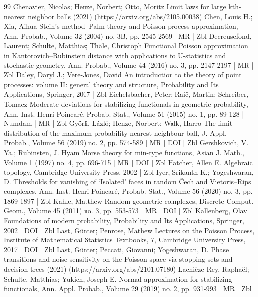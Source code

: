 \documentclass[10pt]{amsart}
\theoremstyle{definition}\newtheorem{defi}[theo]{Definition}\newtheorem{rema}[theo]{Remark}\newtheorem{exam}[theo]{Example}\newtheorem{exem}[theo]{Example}\newtheorem{nota}[theo]{Notation}
\begin{document}
\begin{thebibliography}{99}
Chenavier, Nicolas; Henze, Norbert; Otto, Moritz Limit laws for large kth-nearest neighbor balls (2021) (https://arxiv.org/abs/2105.00038)
Chen, Louis H.; Xia, Aihua Stein’s method, Palm theory and Poisson process approximation, Ann. Probab., Volume 32 (2004) no. 3B, pp. 2545-2569 | MR | Zbl
Decreusefond, Laurent; Schulte, Matthias; Thäle, Christoph Functional Poisson approximation in Kantorovich–Rubinstein distance with applications to U-statistics and stochastic geometry, Ann. Probab., Volume 44 (2016) no. 3, pp. 2147-2197 | MR | Zbl
Daley, Daryl J.; Vere-Jones, David An introduction to the theory of point processes: volume II: general theory and structure, Probability and Its Applications, Springer, 2007 | Zbl
Eichelsbacher, Peter; Raič, Martin; Schreiber, Tomacz Moderate deviations for stabilizing functionals in geometric probability, Ann. Inst. Henri Poincaré, Probab. Stat., Volume 51 (2015) no. 1, pp. 89-128 | Numdam | MR | Zbl
Györfi, Lázló; Henze, Norbert; Walk, Harro The limit distribution of the maximum probability nearest-neighbour ball, J. Appl. Probab., Volume 56 (2019) no. 2, pp. 574-589 | MR | DOI | Zbl
Gershkovich, V. Ya.; Rubinsten, J. Hyam Morse theory for min-type functions, Asian J. Math., Volume 1 (1997) no. 4, pp. 696-715 | MR | DOI | Zbl
Hatcher, Allen E. Algebraic topology, Cambridge University Press, 2002 | Zbl
Iyer, Srikanth K.; Yogeshwaran, D. Thresholds for vanishing of ‘Isolated’ faces in random Čech and Vietoris–Rips complexes, Ann. Inst. Henri Poincaré, Probab. Stat., Volume 56 (2020) no. 3, pp. 1869-1897 | Zbl
Kahle, Matthew Random geometric complexes, Discrete Comput. Geom., Volume 45 (2011) no. 3, pp. 553-573 | MR | DOI | Zbl
Kallenberg, Olav Foundations of modern probability, Probability and Its Applications, Springer, 2002 | DOI | Zbl
Last, Günter; Penrose, Mathew Lectures on the Poisson Process, Institute of Mathematical Statistics Textbooks, 7, Cambridge University Press, 2017 | DOI | Zbl
Last, Günter; Peccati, Giovanni; Yogeshwaran, D. Phase transitions and noise sensitivity on the Poisson space via stopping sets and decision trees (2021) (https://arxiv.org/abs/2101.07180)
Lachièze-Rey, Raphaël; Schulte, Matthias; Yukich, Joseph E. Normal approximation for stabilizing functionals, Ann. Appl. Probab., Volume 29 (2019) no. 2, pp. 931-993 | MR | Zbl

\end{thebibliography}
\end{document}
